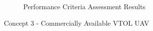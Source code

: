 \begin{figure}[H]
\begin{subfigure}[t]{.5\textwidth}
  \caption{Performance Criteria Assessment Results}
  \label{fig:radar3}
\end{subfigure}
\caption{Concept 3 - Commercially Available VTOL UAV}
\label{fig:concept3}
\end{figure}

